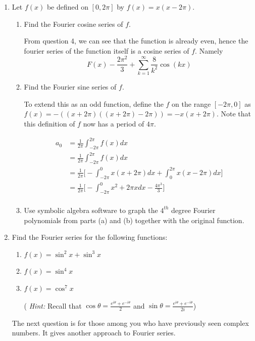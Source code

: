 \documentclass{article}
\begin{document}
\begin{enumerate}
\item Let $f(x)$ be defined on $[0,2\pi]$ by $f(x) = x(x-2\pi)$.
\begin{enumerate}
\item Find the Fourier cosine series of $f$.

From question 4, we can see that the function is already even, hence the fourier series of the function itself is a cosine series of $f$. Namely 
\[ F(x) -\frac{2\pi^2}{3} + \sum_{k=1}^{\infty} \frac{8}{k^2}\cos(kx) \]

\item Find the Fourier sine series of $f$.

To extend this as an odd function, define the $f$ on the range $[-2\pi,0]$ as $f(x) = -((x + 2\pi)((x + 2\pi)-2\pi)) = -x(x + 2\pi)$. Note that this definition of $f$ now has a period of $4\pi$.

\begin{multicols}{2} 
\begin{align*}
    a_0 &= \frac{1}{2\pi} \int_{-2\pi}^{2\pi}f(x) dx \\
    &= \frac{1}{2\pi} \int_{-2\pi}^{2\pi}f(x)dx \\
    &= \frac{1}{2\pi} \Bigg[ -\int_{-2\pi}^{0} x(x+2\pi)dx + \int_{0}^{2\pi} x(x-2\pi)dx \Bigg] \\
    &= \frac{1}{2\pi} \Bigg[ -\int_{-2\pi}^{0} x^2+2\pi xdx - \frac{4\pi^3}{3} \Bigg] \\
\end{align*} 
\end{multicols}
\item Use symbolic algebra software to graph the $4^{th}$ degree Fourier polynomials from parts (a) and (b) together with the original function.
\end{enumerate}
\item Find the Fourier series for the following functions:
\begin{enumerate}
\item $f(x) = \sin^2x + \sin^3x$
\item $f(x) = \sin^4x$
\item $f(x) = \cos^7x$

( \textit{Hint:} Recall that $\cos \theta = \frac{e^{i\theta} + e^{-i\theta}}{2}$ and $\sin \theta = \frac{e^{i\theta} + e^{-i\theta}}{2i}$)
\end{enumerate}

The next question is for those among you who have previously seen complex numbers. It gives another approach to Fourier series.


\end{enumerate}
\end{document}
